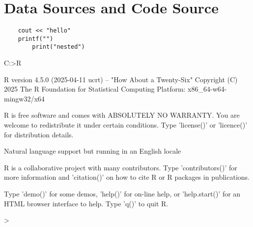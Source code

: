 \section{Data Sources and Code Source}
\begin{mdframed}[hidealllines=true,backgroundcolor=blue!10]
	\begin{lstlisting}
    cout << "hello"
    printf("")
        print("nested")
	\end{lstlisting}
\end{mdframed}
\begin{terminalblock}[caption=Terminal session with commands and output]
  C:\Users{}>R

  R version 4.5.0 (2025-04-11 ucrt) -- "How About a Twenty-Six"
  Copyright (C) 2025 The R Foundation for Statistical Computing
  Platform: x86_64-w64-mingw32/x64
  
  R is free software and comes with ABSOLUTELY NO WARRANTY.
  You are welcome to redistribute it under certain conditions.
  Type 'license()' or 'licence()' for distribution details.
  
    Natural language support but running in an English locale
  
  R is a collaborative project with many contributors.
  Type 'contributors()' for more information and
  'citation()' on how to cite R or R packages in publications.
  
  Type 'demo()' for some demos, 'help()' for on-line help, or
  'help.start()' for an HTML browser interface to help.
  Type 'q()' to quit R.
  
  >
\end{terminalblock}

\begin{mdframed}[hidealllines=true,backgroundcolor=blue!12]
	
\end{mdframed}

\begin{mdframed}[hidealllines=true,backgroundcolor=blue!12]
	
\end{mdframed}